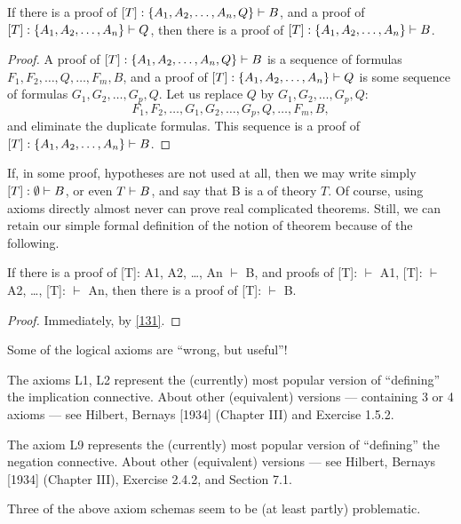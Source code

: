 \begin{theorem}\label{131}
If there is a proof of \([T]: \{A_1, A_2, \ldots, A_n, Q\}\vdash B\), and a proof of \([T]: \{A_1, A_2, \ldots, A_n\}\vdash Q\), then there is a proof of \([T]: \{A_1, A_2, \ldots, A_n\}\vdash B\).
\end{theorem}
\begin{proof}
A proof of \([T]: \{A_1, A_2, \ldots, A_n, Q\}\vdash B\) is a sequence of formulas \(F_1, F_2, \ldots, Q, \ldots, F_m, B\), and a proof of \([T]: \{A_1, A_2, \ldots, A_n\}\vdash Q\) is some sequence of formulas \(G_1, G_2, \ldots , G_p, Q\).
Let us replace \(Q\) by \(G_1, G_2, \ldots, G_p, Q\):
\[
F_1, F_2, \ldots , G_1, G_2, \ldots, G_p, Q, \ldots, F_m, B,
\]
and eliminate the duplicate formulas.
This sequence is a proof of \([T]: \{A_1, A_2, \ldots, A_n\}\vdash B\).
\end{proof}

If, in some proof, hypotheses are not used at all, then we may write simply \([T]: \emptyset\vdash B\), or even \(T\vdash B\), and say that B is a  of theory \(T\).
Of course, using axioms directly almost never can prove real complicated theorems. Still, we can retain our simple formal definition of the notion of theorem because of the following.

\begin{corollary}
If there is a proof of [T]: A1, A2, \ldots , An \(\vdash\) B, and proofs of [T]: \(\vdash\) A1, [T]: \(\vdash\) A2, \ldots , [T]: \(\vdash\)
An, then there is a proof of [T]: \(\vdash\) B.
\end{corollary}
\begin{proof}
Immediately, by \cref{131}.
\end{proof}

Some of the logical axioms are ``wrong, but useful''!

The axioms L1, L2 represent the (currently) most popular version of ``defining'' the implication connective. About other (equivalent) versions --- containing 3 or 4 axioms --- see Hilbert, Bernays [1934] (Chapter III) and Exercise 1.5.2.

The axiom L9 represents the (currently) most popular version of ``defining'' the negation connective.
About other (equivalent) versions --- see Hilbert, Bernays [1934] (Chapter III), Exercise 2.4.2, and Section 7.1.

Three of the above axiom schemas seem to be (at least partly) problematic.

